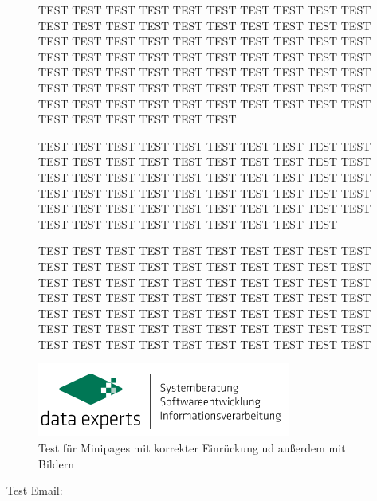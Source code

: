     \begin{figure}[H]
        \begin{minipage}{0.55\textwidth}
    
            TEST TEST TEST TEST TEST TEST TEST TEST TEST TEST TEST TEST TEST TEST TEST TEST TEST TEST TEST TEST TEST TEST TEST TEST TEST TEST TEST TEST TEST TEST TEST TEST TEST TEST TEST TEST TEST 
            TEST TEST TEST TEST TEST TEST TEST TEST TEST TEST TEST TEST TEST TEST TEST TEST TEST TEST TEST TEST TEST TEST TEST TEST TEST TEST TEST TEST TEST TEST TEST TEST TEST TEST TEST TEST TEST TEST TEST 
            
            TEST TEST TEST TEST TEST TEST TEST TEST TEST TEST TEST TEST TEST TEST TEST TEST TEST TEST TEST TEST TEST TEST TEST TEST TEST TEST TEST TEST TEST TEST TEST TEST TEST TEST TEST TEST TEST TEST TEST TEST TEST TEST TEST TEST TEST TEST TEST TEST TEST TEST TEST TEST TEST TEST TEST TEST TEST TEST TEST 

            TEST TEST TEST TEST TEST TEST TEST TEST TEST TEST TEST TEST TEST TEST TEST TEST TEST TEST TEST TEST TEST TEST TEST TEST TEST TEST TEST TEST TEST TEST TEST TEST TEST TEST TEST TEST TEST TEST TEST TEST TEST TEST TEST TEST TEST TEST TEST TEST TEST TEST TEST TEST TEST TEST TEST TEST TEST TEST TEST TEST TEST TEST TEST TEST TEST TEST TEST TEST TEST TEST 
        \end{minipage}
        \hspace{0.05\textwidth}
        \begin{minipage}{0.4\textwidth}
           \centering
            \includegraphics{image/data-experts-logo.png}
            \caption{Test für Minipages mit korrekter Einrückung ud außerdem mit Bildern}
            \label{fig:ex4}
        \end{minipage}
    \end{figure}

    Test Email: 
